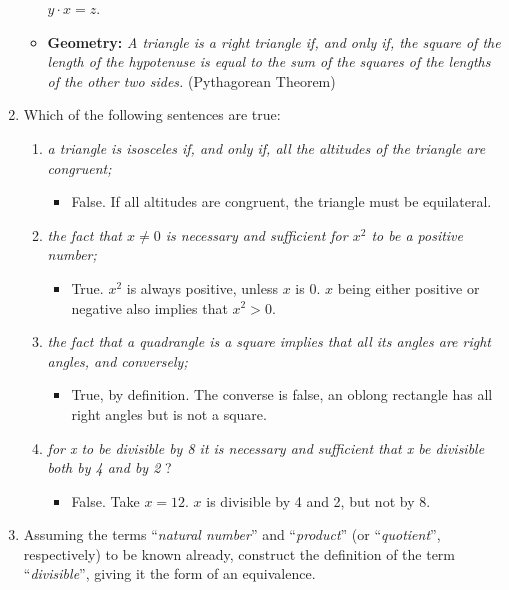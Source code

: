 \begin{enumerate}
\begin{itemize}
    $y{\cdot}x=z$. 
  \item \textbf{Geometry:} \emph{A triangle is a right triangle if,
      and only if, the square of the length of the hypotenuse is equal
      to the sum of the squares of the lengths of the other two
      sides.} (Pythagorean Theorem)
  \end{itemize}
\item Which of the following sentences are true:
  \begin{enumerate}
  \item \emph{a triangle is isosceles if, and only if, all the
      altitudes of the triangle are congruent;}
    \begin{itemize}
    \item False.  If all altitudes are congruent, the triangle must be
      equilateral.
    \end{itemize}
  \item \emph{the fact that $x \neq 0$ is necessary and sufficient for
      $x^2$ to be a positive number;}
    \begin{itemize}
    \item True.  $x^2$ is always positive, unless $x$ is 0.  $x$ being
      either positive or negative also implies that $x^2 > 0$.
    \end{itemize}
  \item \emph{the fact that a quadrangle is a square implies that all
      its angles are right angles, and conversely;}
    \begin{itemize}
    \item True, by definition.  The converse is false, an oblong
      rectangle has all right angles but is not a square.
    \end{itemize}
  \item \emph{for x to be divisible by 8 it is necessary and
      sufficient that x be divisible both by 4 and by 2} \quad ?
    \begin{itemize}
    \item False.  Take $x=12$.  $x$ is divisible by 4 and 2, but
      not by 8.
    \end{itemize}
  \end{enumerate}
\item Assuming the terms ``\emph{natural number}'' and ``\emph{product}'' (or
  ``\emph{quotient}'', respectively) to be known already, construct the
  definition of the term ``\emph{divisible}'', giving it the form of an
  equivalence.


\end{enumerate}
